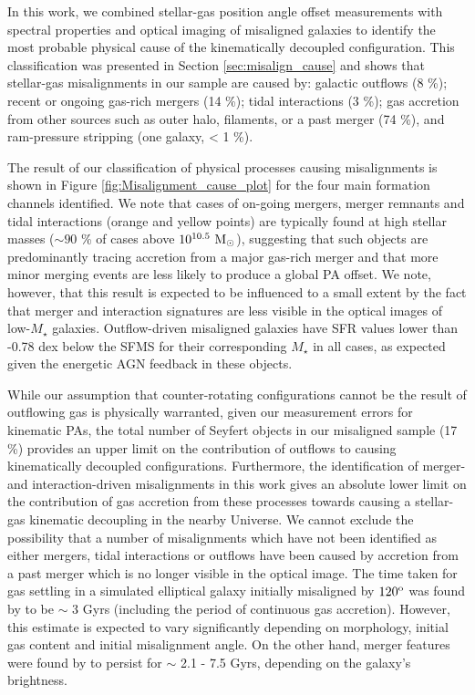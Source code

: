 \documentclass[fleqn,usenatbib]{mnras}
\begin{document}
In this work, we combined stellar-gas position angle offset measurements with spectral properties and optical imaging of misaligned galaxies to identify the most probable physical cause of the kinematically decoupled configuration. This classification was presented in Section \ref{sec:misalign_cause} and shows that stellar-gas misalignments in our sample are caused by: galactic outflows (8 \%); recent or ongoing gas-rich mergers (14 \%); tidal interactions (3 \%); gas accretion from other sources such as outer halo, filaments, or a past merger (74 \%), and ram-pressure stripping (one galaxy, < 1 \%).

The result of our classification of physical processes causing misalignments is shown in Figure \ref{fig:Misalignment_cause_plot} for the four main formation channels identified. We note that cases of on-going mergers, merger remnants and tidal interactions (orange and yellow points) are typically found at high stellar masses ($\sim 90$ \% of cases above $10^{10.5}\ \rm{M_{\odot}}$), suggesting that such objects are predominantly tracing accretion from a major gas-rich merger and that more minor merging events are less likely to produce a global PA offset. We note, however, that this result is expected to be influenced to a small extent by the fact that merger and interaction signatures are less visible in the optical images of low-$M_{\star}$ galaxies. Outflow-driven misaligned galaxies have SFR values lower than -0.78 dex below the SFMS for their corresponding $M_{\star}$ in all cases, as expected given the energetic AGN feedback in these objects. 

While our assumption that counter-rotating configurations cannot be the result of outflowing gas is physically warranted, given our measurement errors for kinematic PAs, the total number of Seyfert objects in our misaligned sample (17 \%) provides an upper limit on the contribution of outflows to causing kinematically decoupled configurations. Furthermore, the identification of merger- and interaction-driven misalignments in this work gives an absolute lower limit on the contribution of gas accretion from these processes towards causing a stellar-gas kinematic decoupling in the nearby Universe. We cannot exclude the possibility that a number of misalignments which have not been identified as either mergers, tidal interactions or outflows have been caused by accretion from a past merger which is no longer visible in the optical image. The time taken for gas settling in a simulated elliptical galaxy initially misaligned by $120^{\rm{o}}$ was found by \cite{Freekevdv2015} to be $\sim$ 3 Gyrs (including the period of continuous gas accretion). However, this estimate is expected to vary significantly depending on morphology, initial gas content and initial misalignment angle. 
On the other hand, merger features were found by \cite{Ji2014Mergers2} to persist for $\sim$ 2.1 - 7.5 Gyrs, depending on the galaxy's brightness.
\end{document}
